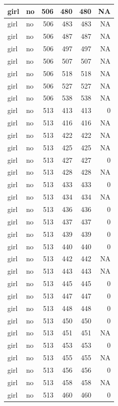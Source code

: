 \documentclass[man]{apa6}
\begin{document}
\begin{tabular}{l|l|r|r|r|r}
\hline
girl & no & 506 & 480 & 480 & NA\\
\hline
girl & no & 506 & 483 & 483 & NA\\
\hline
girl & no & 506 & 487 & 487 & NA\\
\hline
girl & no & 506 & 497 & 497 & NA\\
\hline
girl & no & 506 & 507 & 507 & NA\\
\hline
girl & no & 506 & 518 & 518 & NA\\
\hline
girl & no & 506 & 527 & 527 & NA\\
\hline
girl & no & 506 & 538 & 538 & NA\\
\hline
girl & no & 513 & 413 & 413 & 0\\
\hline
girl & no & 513 & 416 & 416 & NA\\
\hline
girl & no & 513 & 422 & 422 & NA\\
\hline
girl & no & 513 & 425 & 425 & NA\\
\hline
girl & no & 513 & 427 & 427 & 0\\
\hline
girl & no & 513 & 428 & 428 & NA\\
\hline
girl & no & 513 & 433 & 433 & 0\\
\hline
girl & no & 513 & 434 & 434 & NA\\
\hline
girl & no & 513 & 436 & 436 & 0\\
\hline
girl & no & 513 & 437 & 437 & 0\\
\hline
girl & no & 513 & 439 & 439 & 0\\
\hline
girl & no & 513 & 440 & 440 & 0\\
\hline
girl & no & 513 & 442 & 442 & NA\\
\hline
girl & no & 513 & 443 & 443 & NA\\
\hline
girl & no & 513 & 445 & 445 & 0\\
\hline
girl & no & 513 & 447 & 447 & 0\\
\hline
girl & no & 513 & 448 & 448 & 0\\
\hline
girl & no & 513 & 450 & 450 & 0\\
\hline
girl & no & 513 & 451 & 451 & NA\\
\hline
girl & no & 513 & 453 & 453 & 0\\
\hline
girl & no & 513 & 455 & 455 & NA\\
\hline
girl & no & 513 & 456 & 456 & 0\\
\hline
girl & no & 513 & 458 & 458 & NA\\
\hline
girl & no & 513 & 460 & 460 & 0\\

\end{tabular}
\end{document}
